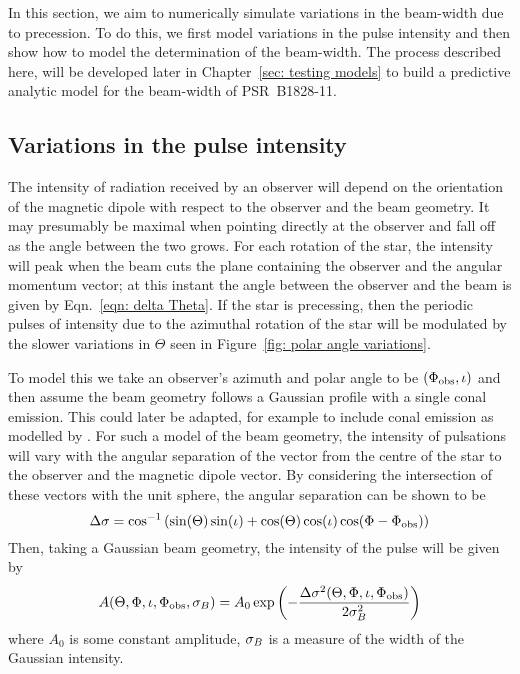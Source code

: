 \documentclass[../full_thesis/full_thesis.tex]{subfiles}
\begin{document}
In this section, we aim to numerically simulate variations in the beam-width
due to precession. To do this, we first model variations in the pulse intensity
and then show how to model the determination of the beam-width. The process
described here, will be developed later in Chapter~\ref{sec: testing models} to
build a predictive analytic model for the beam-width of PSR~B1828-11.

\subsection{Variations in the pulse intensity}

The intensity of radiation received by an observer will depend on the
orientation of the magnetic dipole with respect to the observer and the beam
geometry. It may presumably be maximal when pointing directly at the observer
and fall off as the angle between the two grows. For each rotation of the star,
the intensity will peak when the beam cuts the plane containing the observer
and the angular momentum vector; at this instant the angle between the
observer and the beam is given by Eqn.~\eqref{eqn: delta Theta}. If the star is
precessing, then the periodic pulses of intensity due to the azimuthal rotation
of the star will be modulated by the slower variations in $\Theta$ seen in
Figure~\ref{fig: polar angle variations}.

To model this we take an observer's azimuth and polar angle to be $(\Phi_{\mathrm{obs}},
\iota)$ and then assume the beam geometry follows a Gaussian profile with a
single conal emission.  This could later be adapted, for example to include
conal emission as modelled by \citet{Akgun2006}.  For such a model of the beam
geometry, the intensity of pulsations will vary with the angular separation of
the vector from the centre of the star to the observer and the magnetic dipole
vector. By considering the intersection of these vectors with the unit sphere,
the angular separation can be shown to be
\begin{equation}
\Delta\sigma = \cos^{-1}\left(\sin(\Theta)\sin(\iota) +
                             \cos(\Theta)\cos(\iota)\cos(\Phi - \Phi_{\mathrm{obs}})\right)
\label{eqn: angular sep inv cos}
\end{equation}
Then, taking a Gaussian beam geometry, the intensity of the pulse will be given by
\begin{equation}
A(\Theta, \Phi, \iota, \Phi_{\mathrm{obs}}, \sigma_{B}) =
A_{0} \exp\left(-\frac{\Delta\sigma^{2}(\Theta, \Phi, \iota, \Phi_{\mathrm{obs}})}{2\sigma_{B}^{2}}\right)
\label{eqn: Gaussian beam intensity}
\end{equation}
where $A_{0}$ is some constant amplitude, $\sigma_{B}$ is a measure of the width of
the Gaussian intensity.
\end{document}

